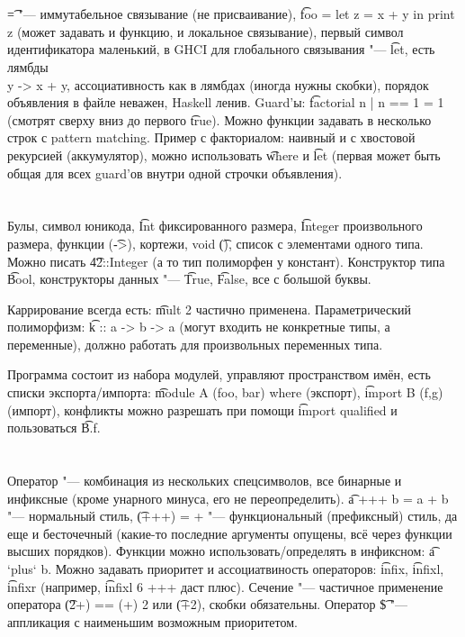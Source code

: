 \section{} %
\t{=} "--- иммутабельное связывание (не присваивание), \t{foo = let z = x + y in print z}
(может задавать и функцию, и локальное связывание),
первый символ идентификатора маленький, в GHCI для глобального связывания "--- \t{let},
есть лямбды \t{\\y -> x + y}, ассоциативность как в лямбдах (иногда нужны скобки),
порядок объявления в файле неважен, Haskell ленив.
Guard'ы: \t{factorial n | n == 1 = 1} (смотрят сверху вниз до первого \t{true}).
Можно функции задавать в несколько строк с pattern matching.
Пример с факториалом: наивный и с хвостовой рекурсией (аккумулятор), можно использовать \t{where} и \t{let}
(первая может быть общая для всех guard'ов внутри одной строчки объявления).

\section{} %
Булы, символ юникода, \t{Int} фиксированного размера, \t{Integer} произвольного размера,
функции (\t{->}), кортежи, void \t{()}, список с элементами одного типа.
Можно писать \t{42::Integer} (а то тип полиморфен у констант).
Конструктор типа \t{Bool}, конструкторы данных "--- \t{True}, \t{False}, все с большой буквы.

Каррирование всегда есть: \t{mult 2} частично применена.
Параметрический полиморфизм: \t{k :: a -> b -> a} (могут входить не конкретные типы,
а переменные), должно работать для произвольных переменных типа.

Программа состоит из набора модулей, управляют пространством имён, есть списки экспорта/импорта:
\t{module A (foo, bar) where} (экспорт), \t{import B (f,g)} (импорт), конфликты можно разрешать
при помощи \t{import qualified} и пользоваться \t{B.f}.

\section{} %
Оператор "--- комбинация из нескольких спецсимволов, все бинарные и инфиксные (кроме унарного минуса,
его не переопределить).
\t{a +++ b = a + b} "--- нормальный стиль, \t{(+++) = +} "--- функциональный (префиксный) стиль,
да еще и бесточечный (какие-то последние аргументы опущены, всё через функции высших порядков).
Функции можно использовать/определять в инфиксном: \t{a `plus` b}.
Можно задавать приоритет и ассоциатвиность операторов: \t{infix}, \t{infixl}, \t{infixr}
(например, \t{infixl 6 +++} даст плюс).
Сечение "--- частичное применение оператора \t{(2+) == (+) 2} или \t{(+2)}, скобки обязательны.
Оператор \t{\$} "--- аппликация с наименьшим возможным приоритетом.

